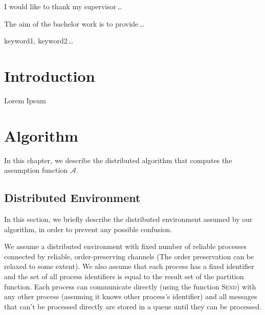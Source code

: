 \documentclass[12pt,oneside,draft]{fithesis2}
\newcommand{\as}[1][]{\ensuremath{\mathcal{A}_{#1}}}
\newcommand{\method}[1]{\textnormal{\textsc{#1}}}
\begin{document}
  \FrontMatter                    %
    \ThesisTitlePage                %
    \begin{ThesisDeclaration}       %
      \DeclarationText
      \AdvisorName
    \end{ThesisDeclaration}
    \begin{ThesisThanks}            %
      I would like to thank my supervisor\,\dots
    \end{ThesisThanks}
    \begin{ThesisAbstract}          %
      The aim of the bachelor work is to provide\,\dots
    \end{ThesisAbstract}
    \begin{ThesisKeyWords}          %
      keyword1, keyword2\,\dots
    \end{ThesisKeyWords}
    \tableofcontents                %
  
  \MainMatter                     %
    \chapter{Introduction}          %
	Lorem Ipsum \cite{testCite}
    \chapter{Algorithm}
    
    	In this chapter, we describe the distributed algorithm that computes the assumption function $\as$. 
    	
    	\section{Distributed Environment}
    	
		In this section, we briefly describe the distributed environment assumed by our algorithm, in order to prevent any possible confusion.
		
		We assume a distributed environment with fixed number of reliable processes connected by reliable, order-preserving channels (The order preservation can be relaxed to some extent). We also assume that each process has a fixed identifier and the set of all process identifiers is equal to the result set of the partition function. Each process can communicate directly (using the function \method{Send}) with any other process (assuming it knows other process's identifier) and all messages that can't be processed directly are stored in a queue until they can be processed.
		
\end{document}
